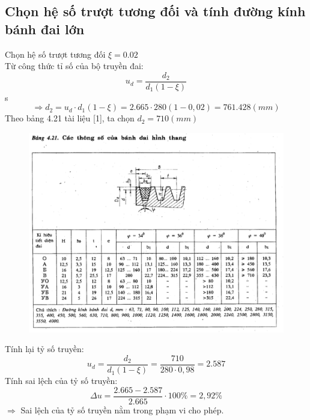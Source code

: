 \subsection{Chọn hệ số trượt tương đối và tính đường kính bánh đai lớn}
Chọn hệ số trượt tương đối $\xi = 0.02$ \\
Từ công thức tỉ số của bộ truyền đai: \\
\[
    u_d = \frac{d_2}{d_1(1 - \xi)}
\]s
\[
    \Rightarrow d_2 = u_d \cdot d_1(1 - \xi) = 2.665 \cdot 280(1 - 0,02) = 761.428 (mm)
\]
Theo bảng 4.21 tài liệu [1], ta chọn $d_2 = 710 (mm)$
\begin{figure}[H]
    \centering
    \includegraphics[width=1\textwidth]{pictures/bang4.21.png}
\end{figure}
Tính lại tỷ số truyền:
\[
    u_d = \frac{d_2}{d_1(1 - \xi)} = \frac{710}{280 \cdot 0,98} = 2.587
\]
Tính sai lệch của tỷ số truyền:
\[
    \Delta u = \frac{2.665 - 2.587}{2.665} \cdot 100\% = 2,92\%
\]
$\Rightarrow$ Sai lệch của tỷ số truyền nằm trong phạm vi cho phép.

